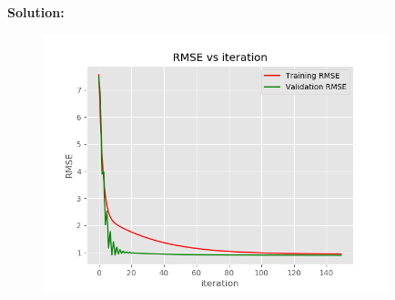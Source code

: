 \documentclass[letter,11pt]{article}
\newenvironment{solution}{
    \vspace{0.16in} {\bf Solution:}
    
}{
	\vspace{0.16in}
}
\begin{document}
\begin{enumerate}
\begin{enumerate}
        \begin{solution}
            \begin{figure}[h]
                \centering
                \includegraphics[width=10cm]{convergence.png}
            \end{figure}
        \end{solution}
    \end{enumerate}
\end{enumerate}
\end{document}
